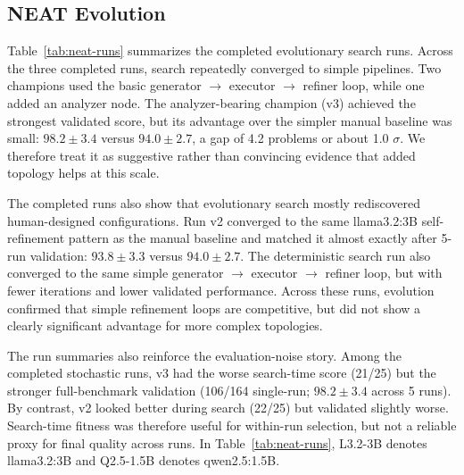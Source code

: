 \documentclass{article}
\begin{document}
\subsection{NEAT Evolution}
Table~\ref{tab:neat-runs} summarizes the completed evolutionary search runs. Across the three completed runs, search repeatedly converged to simple pipelines. Two champions used the basic generator $\rightarrow$ executor $\rightarrow$ refiner loop, while one added an analyzer node. The analyzer-bearing champion (v3) achieved the strongest validated score, but its advantage over the simpler manual baseline was small: $98.2 \pm 3.4$ versus $94.0 \pm 2.7$, a gap of 4.2 problems or about 1.0 $\sigma$. We therefore treat it as suggestive rather than convincing evidence that added topology helps at this scale.

The completed runs also show that evolutionary search mostly rediscovered human-designed configurations. Run v2 converged to the same llama3.2:3B self-refinement pattern as the manual baseline and matched it almost exactly after 5-run validation: $93.8 \pm 3.3$ versus $94.0 \pm 2.7$. The deterministic search run also converged to the same simple generator $\rightarrow$ executor $\rightarrow$ refiner loop, but with fewer iterations and lower validated performance. Across these runs, evolution confirmed that simple refinement loops are competitive, but did not show a clearly significant advantage for more complex topologies.

The run summaries also reinforce the evaluation-noise story. Among the completed stochastic runs, v3 had the worse search-time score (21/25) but the stronger full-benchmark validation (106/164 single-run; $98.2 \pm 3.4$ across 5 runs). By contrast, v2 looked better during search (22/25) but validated slightly worse. Search-time fitness was therefore useful for within-run selection, but not a reliable proxy for final quality across runs. In Table~\ref{tab:neat-runs}, L3.2-3B denotes llama3.2:3B and Q2.5-1.5B denotes qwen2.5:1.5B.
\end{document}
